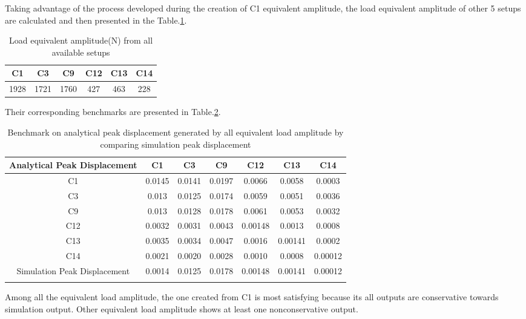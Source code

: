 Taking advantage of the process developed during the creation of C1 equivalent amplitude, the load equivalent amplitude of other 5 setups are calculated and then presented in the Table.\ref{tab:allLoadEquivalentAmplitude}.

\begin{table}[h!]
    \centering
    \caption{Load equivalent amplitude(N) from all available setups}
    \begin{tabular}{cccccc}
        \hline
        C1 & C3 & C9 & C12 & C13 & C14 \\
        \hline
        1928 & 1721 & 1760 & 427 & 463 & 228 \\
        \hline
    \end{tabular}
    \label{tab:allLoadEquivalentAmplitude}
\end{table}

Their corresponding benchmarks are presented in Table.\ref{tab:allBenchmark}.

\begin{table}[h!]
    \centering
    \caption{Benchmark on analytical peak displacement generated by all equivalent load amplitude by comparing simulation peak displacement}
    \begin{tabular}{ccccccc}
        \hline
        Analytical Peak Displacement & C1 & C3 & C9 & C12 & C13 & C14 \\
        \hline
        C1 & 0.0145 & 0.0141 & 0.0197 & 0.0066 & 0.0058 & 0.0003 \\
        C3 & 0.013 & 0.0125 & 0.0174 & 0.0059 & 0.0051 & 0.0036 \\
        C9 & 0.013 & 0.0128 & 0.0178 & 0.0061 & 0.0053 & 0.0032 \\
        C12 & 0.0032 & 0.0031 & 0.0043 & 0.00148 & 0.0013 & 0.0008 \\
        C13 & 0.0035 & 0.0034 & 0.0047 & 0.0016 & 0.00141 & 0.0002 \\
        C14 & 0.0021 & 0.0020 & 0.0028 & 0.0010 & 0.0008 & 0.00012 \\
        \hline
        Simulation Peak Displacement & 0.0014 & 0.0125 & 0.0178 & 0.00148 & 0.00141 & 0.00012 \\
        \hline
        \label{tab:allBenchmark}
    \end{tabular}
\end{table}

Among all the equivalent load amplitude, the one created from C1 is most satisfying because its all outputs are conservative towards simulation output. Other equivalent load amplitude shows at least one nonconservative output. 

